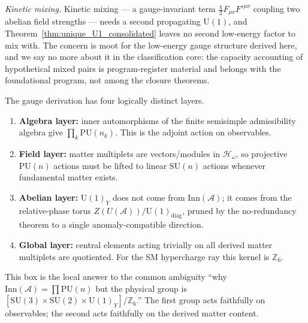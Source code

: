 \documentclass[11pt]{article}
\theoremstyle{definition}
\newcommand{\SU}{\mathrm{SU}}
\newcommand{\U}{\mathrm{U}}
\begin{document}
\smallskip\noindent\textit{Kinetic mixing.}\quad
Kinetic mixing --- a gauge-invariant term
$\frac{\chi}{2} F_{\mu\nu} F'^{\mu\nu}$ coupling two abelian field
strengths --- needs a second propagating $\U(1)$, and
Theorem~\ref{thm:unique_U1_consolidated} leaves no second low-energy factor to mix with.  The
concern is moot for the low-energy gauge structure derived here, and
we say no more about it in the classification core: the capacity
accounting of hypothetical mixed pairs is program-register material
and belongs with the foundational program, not among the closure
theorems.

\begin{tcolorbox}[apfbox, title={Roadmap: from $\mathrm{PU}$ automorphisms to the physical SM group}]
\footnotesize
The gauge derivation has four logically distinct layers.
\begin{enumerate}[nosep,leftmargin=1.8em]
  \item \textbf{Algebra layer:} inner automorphisms of the finite
  semisimple admissibility algebra give $\prod_k\mathrm{PU}(n_k)$.
  This is the adjoint action on observables.
  \item \textbf{Field layer:} matter multiplets are vectors/modules in
  $\mathcal H_\omega$, so projective $\mathrm{PU}(n)$ actions must be
  lifted to linear $\SU(n)$ actions whenever fundamental matter exists.
  \item \textbf{Abelian layer:} $\U(1)_Y$ does not come from
  $\mathrm{Inn}(\mathcal A)$; it comes from the relative-phase torus
  $Z(U(\mathcal A))/\U(1)_{\mathrm{diag}}$, pruned by the no-redundancy
  theorem to a single anomaly-compatible direction.
  \item \textbf{Global layer:} central elements acting trivially on all
  derived matter multiplets are quotiented.  For the SM hypercharge ray
  this kernel is $\mathbb Z_6$.
\end{enumerate}
This box is the local answer to the common ambiguity ``why
$\mathrm{Inn}(\mathcal A)=\prod\mathrm{PU}(n)$ but the physical group is
$[\SU(3)\times\SU(2)\times\U(1)_Y]/\mathbb Z_6$.''  The first group acts
faithfully on observables; the second acts faithfully on the derived
matter content.
\end{tcolorbox}
\end{document}
